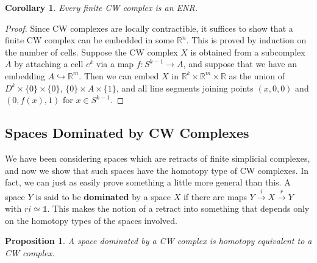 \documentclass{article}
\newtheorem{proposition}[theorem]{Proposition}
\newtheorem{corollary}[theorem]{Corollary}
\theoremstyle{definition}
\begin{document}
\begin{corollary}
Every finite CW complex is an ENR.
\end{corollary}

\begin{proof}
Since CW complexes are locally contractible, it suffices to show that a finite CW complex can be embedded in some $\mathbb{R}^n$. This is proved by induction on the number of cells. Suppose the CW complex $X$ is obtained from a subcomplex $A$ by attaching a cell $e^k$ via a map $f: S^{k-1} \to A$, and suppose that we have an embedding $A \hookrightarrow \mathbb{R}^m$. Then we can embed $X$ in $\mathbb{R}^k \times \mathbb{R}^m \times \mathbb{R}$ as the union of $D^k \times \{0\} \times \{0\}$, $\{0\} \times A \times \{1\}$, and all line segments joining points $(x, 0, 0)$ and $(0, f(x), 1)$ for $x \in S^{k-1}$.
\end{proof}

\subsection*{Spaces Dominated by CW Complexes}

We have been considering spaces which are retracts of finite simplicial complexes, and now we show that such spaces have the homotopy type of CW complexes. In fact, we can just as easily prove something a little more general than this. A space $Y$ is said to be \textbf{dominated} by a space $X$ if there are maps $Y \xrightarrow{i} X \xrightarrow{r} Y$ with $ri \simeq \mathbb{1}$. This makes the notion of a retract into something that depends only on the homotopy types of the spaces involved.

\begin{proposition}
A space dominated by a CW complex is homotopy equivalent to a CW complex.
\end{proposition}
\end{document}
